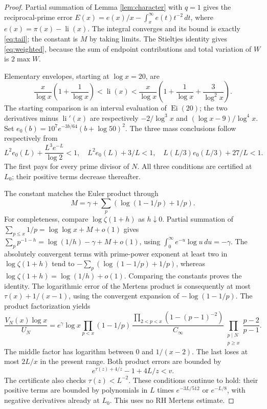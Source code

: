 \documentclass[11pt]{article}
\theoremstyle{remark}\newtheorem{remark}[theorem]{Remark}
\newcommand{\li}{\operatorname{li}}
\begin{document}
\begin{proof}
Partial summation of Lemma \ref{lem:character} with $q=1$ gives the
reciprocal-prime error $E(x)=e(x)/x-\int_x^\infty e(t)t^{-2}\,dt$,
where $e(x)=\pi(x)-\li(x)$. The integral converges and its bound is
exactly \eqref{eq:tail}; the constant is $M$ by taking limits.
The Stieltjes identity gives \eqref{eq:weighted}, because the sum of
endpoint contributions and total variation of $W$ is $2\max W$.

Elementary envelopes, starting at $\log x=20$, are
\[
\frac{x}{\log x}\left(1+\frac1{\log x}\right)<\li(x)
<\frac{x}{\log x}\left(1+\frac1{\log x}+\frac3{\log^2x}\right).
\]
The starting comparison is an interval evaluation of $\operatorname{Ei}(20)$;
the two derivatives minus $\li'(x)$ are respectively
$-2/\log^3x$ and $(\log x-9)/\log^4x$.
Set $e_0(b)=10^7e^{-3b/64}(b+\log50)^2$.
The three mass conclusions follow respectively from
\[
L^2e_0(L)+\frac{L^3e^{-L}}{\log2}<1,\quad
L^2e_0(L)+3/L<1,\quad
L(L/3)e_0(L/3)+27/L<1.
\]
The first pays for every prime divisor of $N$. All three conditions
are certified at $L_0$; their positive terms decrease thereafter.

The constant matches the Euler product through
\[
M=\gamma+\sum_p\left(\log(1-1/p)+1/p\right).
\]
For completeness, compare $\log\zeta(1+h)$ as $h\downarrow0$.
Partial summation of $\sum_{p\le x}1/p=\log\log x+M+o(1)$ gives
$\sum_pp^{-1-h}=\log(1/h)-\gamma+M+o(1)$, using
$\int_0^\infty e^{-u}\log u\,du=-\gamma$.
The absolutely convergent terms with prime-power exponent at least two
in $\log\zeta(1+h)$ tend to
$-\sum_p(\log(1-1/p)+1/p)$, whereas
$\log\zeta(1+h)=\log(1/h)+o(1)$. Comparing the constants proves the identity.
The logarithmic error of the Mertens product is consequently at most
$\tau(x)+1/(x-1)$, using the convergent expansion of $-\log(1-1/p)$.
The product factorization yields
\[
\frac{V_N(x)\log x}{U_N}=
e^\gamma\log x\prod_{p<x}(1-1/p)\,
\frac{\prod_{2<p<x}(1-(p-1)^{-2})}{C_\infty}
\prod_{\substack{p\mid N\\p\ge x}}\frac{p-2}{p-1}.
\]
The middle factor has logarithm between $0$ and $1/(x-2)$.
The last loses at most $2L/x$ in the present range. Both product
errors are bounded by
\[
e^{\tau(z)+4/z}-1+4L/z<v.
\]
The certificate also checks $\tau(z)<L^{-2}$. These conditions
continue to hold: their positive terms are bounded by polynomials in
$L$ times $e^{-3L/512}$ or $e^{-L/8}$, with negative derivatives
already at $L_0$. This uses no RH Mertens estimate.
\end{proof}
\end{document}
